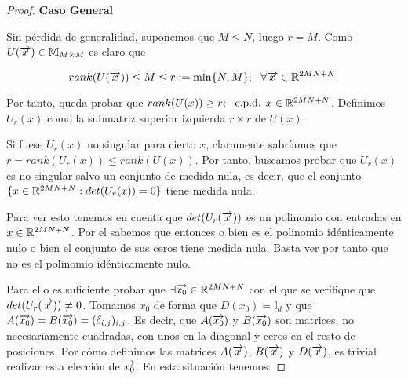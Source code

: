 \begin{proof}
    \textbf{Caso General}

    Sin pérdida de generalidad, suponemos que $M \leq N$, luego $r = M$. Como $U(\overrightarrow{x}) \in \mathbb{M}_{M \times M}$ es claro que

    \begin{equation}
        rank(U(\overrightarrow{x})) \leq M \leq r := \min \{N, M \}; \ \  \forall \overrightarrow{x} \in \mathbb{R}^{2MN + N}.
    \end{equation}

    Por tanto, queda probar que $rank(U(x)) \geq r; \ \  \text{c.p.d. } x \in \mathbb{R}^{2MN + N}$. Definimos $U_r(x)$ como la submatriz superior izquierda $r \times r$ de $U(x)$.

    Si fuese $U_r(x)$ no singular para cierto $x$, claramente sabríamos que $r = rank(U_r(x)) \leq rank(U(x))$. Por tanto, buscamos probar que $U_r(x)$ es no singular salvo un conjunto de medida nula, es decir, que el conjunto $\{ x \in \mathbb{R}^{2MN + N} : det(U_r(x)) = 0  \}$ tiene medida nula.

    Para ver esto tenemos en cuenta que $det(U_r(\overrightarrow{x}))$ es un polinomio con entradas en $x \in \mathbb{R}^{2MN + N}$. Por el  sabemos que entonces o bien es el polinomio idénticamente nulo o bien el conjunto de sus ceros tiene medida nula. Basta ver por tanto que no es el polinomio idénticamente nulo.

    Para ello es suficiente probar que $\exists \overrightarrow{x_0} \in \mathbb{R}^{2MN + N}$ con el que se verifique que $det(U_r(\overrightarrow{x})) \neq 0$. Tomamos $x_0$ de forma que $D(x_0) = \mathbb{I}_d$ y que $A(\overrightarrow{x_0}) = B(\overrightarrow{x_0}) = (\delta_{i,j})_{i,j}$. Es decir, que $A(\overrightarrow{x_0})$ y $B(\overrightarrow{x_0})$ son matrices, no necesariamente cuadradas, con unos en la diagonal y ceros en el resto de posiciones. Por cómo definimos las matrices $A(\overrightarrow{x})$, $B(\overrightarrow{x})$ y $D(\overrightarrow{x})$, es trivial realizar esta elección de $\overrightarrow{x_0}$. En esta situación tenemos:


\end{proof}
